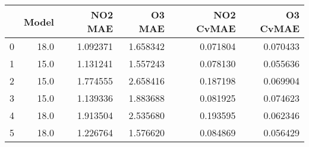 \begin{tabular}{lrrrrr}
\toprule
{} &  Model &   NO2 MAE &    O3 MAE &  NO2 CvMAE &  O3 CvMAE \\
\midrule
0 &   18.0 &  1.092371 &  1.658342 &   0.071804 &  0.070433 \\
1 &   15.0 &  1.131241 &  1.557243 &   0.078130 &  0.055636 \\
2 &   15.0 &  1.774555 &  2.658416 &   0.187198 &  0.069904 \\
3 &   15.0 &  1.139336 &  1.883688 &   0.081925 &  0.074623 \\
4 &   18.0 &  1.913504 &  2.535680 &   0.193595 &  0.062346 \\
5 &   18.0 &  1.226764 &  1.576620 &   0.084869 &  0.056429 \\
\bottomrule
\end{tabular}
